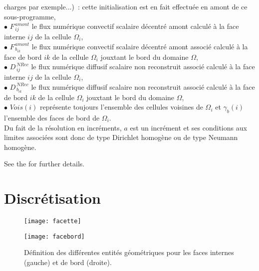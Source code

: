 charges par exemple...)~: cette initialisation est en fait effectuée en amont
de ce sous-programme, \\
$\bullet$ $F^{\,amont}_{\,ij}$ le flux numérique convectif scalaire
décentré amont calculé à la face interne $ij$ de la cellule $\Omega_i$,\\
$\bullet$ $F^{\,amont}_{\,b_{ik}}$ le flux numérique convectif scalaire
décentré amont associé calculé à la face de bord $ik$ de la cellule $\Omega_i$
jouxtant le bord du domaine $\Omega$,\\
$\bullet$ $D^{\,NRec}_{\,ij}$ le flux numérique diffusif scalaire non
reconstruit associé calculé à la face interne $ij$ de la cellule $\Omega_i$,\\
$\bullet$ $D^{\,NRec}_{\,{b}_{ik}}$ le flux numérique diffusif scalaire non
reconstruit associé calculé à la face de bord $ik$ de la cellule $\Omega_i$ jouxtant le bord du domaine $\Omega$,\\
$\bullet$ $Vois(i)$ représente toujours l'ensemble des cellules
voisines de ${\Omega_i}$ et $\gamma_b(i)$ l'ensemble des faces de
bord de ${\Omega_i}$.\\
Du fait de la résolution en incréments, $a$ est un incrément et ses
conditions aux limites associées sont donc de type Dirichlet homogène ou de
type
Neumann homogène.

See the  for further details.

\section*{Discrétisation}

\begin{figure}[h]
\parbox{8cm}{%
\centerline{\texttt{[image: facette]}}}
\parbox{8cm}{%
\centerline{\texttt{[image: facebord]}}}
\caption{\label{Base_Matrix_fig_geom_gradmc}Définition des différentes entités
géométriques pour les faces internes (gauche) et de bord (droite).}
\end{figure}

